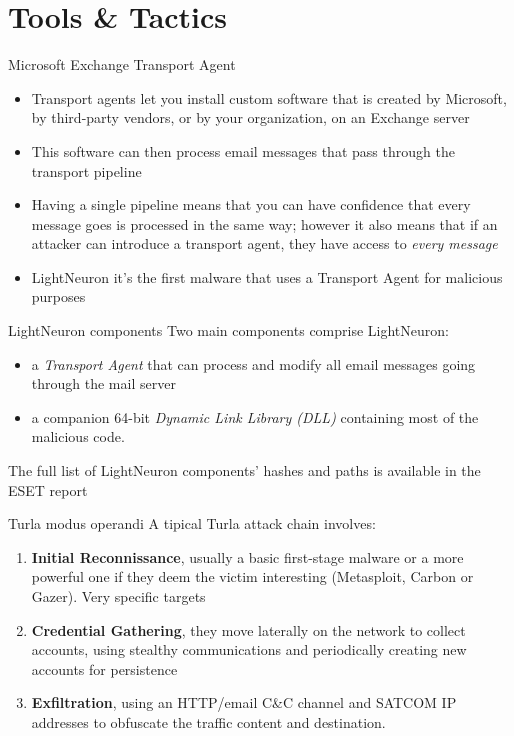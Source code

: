 \section{Tools \& Tactics}

\begin{frame}[fragile]{Microsoft Exchange Transport Agent}
    \begin{itemize}
        \item Transport agents let you install custom software that is created by Microsoft, by third-party vendors, or by your organization, on an Exchange server \cite{transMicro}
        \item This software can then process email messages that pass through the transport pipeline
        \item Having a single pipeline means that you can have confidence that every message goes is processed in the same way; however it also means that if an attacker can introduce a transport agent, they have access to \emph{every message}
        \item LightNeuron it's the first malware that uses a Transport Agent for malicious purposes
    \end{itemize}
\end{frame}

\begin{frame}[fragile]{LightNeuron components}
    Two main components comprise LightNeuron: 
    \begin{itemize}
        \item a \emph{Transport Agent} that can process and modify all email messages going through the mail server 
        \item a companion 64-bit \emph{Dynamic Link Library (DLL)} containing most of the malicious code.
    \end{itemize}
    The full list of LightNeuron components' hashes and paths is available in the ESET report \cite{Turla19}
\end{frame}


\begin{frame}[fragile]{Turla modus operandi}
    A tipical Turla attack chain involves:
    \begin{enumerate}
        \item \textbf{Initial Reconnissance}, usually a basic first-stage malware or a more powerful one if they deem the victim interesting (Metasploit, Carbon or Gazer). Very specific targets
        \item \textbf{Credential Gathering}, they move laterally on the network to collect accounts, using stealthy communications and periodically creating new accounts for persistence
        \item \textbf{Exfiltration}, using an HTTP/email C\&C channel and SATCOM IP addresses to obfuscate the traffic content and destination. 
    \end{enumerate}
    
\end{frame}

